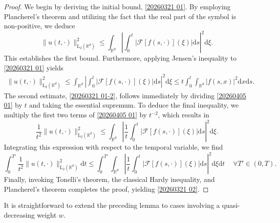 \documentclass[11pt,reqno]{amsart}
\theoremstyle{definition}
\theoremstyle{remark}
\numberwithin{equation}{section}
\begin{document}
\begin{proof}

We begin by deriving the initial bound, \eqref{20260321 01}. 
By employing Plancherel's theorem and utilizing the fact that the real part of the symbol is non-positive,
 we deduce
 $$
\|u(t,\cdot)\|^2_{\mathrm{L}_2(\mathbb{R}^d)} \leq \int_{\mathbb{R}^d} \left|\int_0^t |\mathcal{F}[f(s,\cdot)](\xi)| \mathrm{d}s \right|^2 \mathrm{d}\xi.
 $$
 This establishes the first bound. 
 Furthermore, applying Jensen's inequality to \eqref{20260321 01} yields
\begin{align}
										\label{20260405 01}
\|u(t,\cdot)\|^2_{\mathrm{L}_2(\mathbb{R}^d)} 
\leq \int_{\mathbb{R}^d} \left|\int_0^t |\mathcal{F}[f(s,\cdot)](\xi)| \mathrm{d}s \right|^2 \mathrm{d}\xi 
\leq t\int_0^t \int_{\mathbb{R}^d} |f(s,x)|^2 \mathrm{d}x \mathrm{d}s.
\end{align}
 The second estimate, \eqref{20260321 01-2}, follows immediately by dividing \eqref{20260405 01} by $t$ and taking the essential supremum. 
 To deduce the final inequality, we multiply the first two terms of \eqref{20260405 01} by $t^{-2}$, which results in
 $$
 \frac{1}{t^2}\|u(t,\cdot)\|^2_{\mathrm{L}_2(\mathbb{R}^d)} \leq \int_{\mathbb{R}^d} \left|\frac{1}{t}\int_0^t |\mathcal{F}[f(s,\cdot)](\xi)| \mathrm{d}s \right|^2 \mathrm{d}\xi.
 $$
 Integrating this expression with respect to the temporal variable, we find
 $$
 \int_0^{T'} \frac{1}{t^2}\|u(t,\cdot)\|^2_{\mathrm{L}_2(\mathbb{R}^d)} \mathrm{d}t \leq \int_0^{T'}\int_{\mathbb{R}^d} \left|\frac{1}{t}\int_0^t |\mathcal{F}[f(s,\cdot)](\xi)| \mathrm{d}s \right|^2 \mathrm{d}\xi\mathrm{d}t~ \quad \forall T' \in (0,T).
 $$
 Finally, invoking Tonelli's theorem, the classical Hardy inequality, and Plancherel's theorem completes the proof, yielding \eqref{20260321 02}.
\end{proof}

It is straightforward to extend the preceding lemma to cases involving a quasi-decreasing weight $w$.
\end{document}
